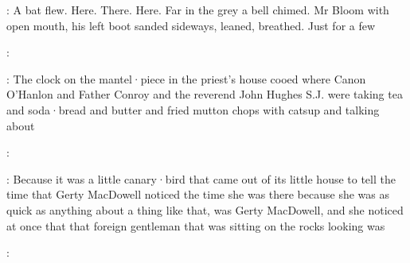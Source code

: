 \Bloom:
A bat flew.
Here.
There.
Here.
Far in the grey
a bell chimed.
Mr Bloom with open mouth,
his left boot sanded sideways,
leaned,
breathed.
Just for a few

:

:
The clock on the mantel·piece in the priest's house
cooed
where Canon O'Hanlon
and Father Conroy
and the reverend John Hughes S.J.
were taking tea
and soda·bread and butter
and fried mutton chops with catsup
and talking about

:

:
Because it was a little canary·bird
that came out of its little house
to tell the time
that Gerty MacDowell noticed the time she was there
because she was as quick as anything
about a thing like that,
was Gerty MacDowell,
and she noticed at once
that
that foreign gentleman
that was sitting on the rocks looking
was

:
